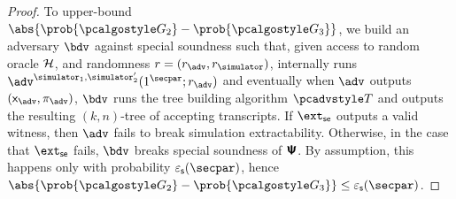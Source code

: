 \begin{proof}
	To upper-bound $\abs{\prob{\game{2}} - \prob{\game{3}}}$, we build an adversary $\bdv$ against special soundness such that,
	given access to random oracle $\mathcal{H}$, and randomness $r = (r_\adv, \rsim)$,
	internally runs $\advse^{\simulator_1, \simulator_2'} (1^\secpar; r_\adv)$ and eventually when $\advse$ outputs $(\inp_\advse, \zkproof_\advse)$, $\bdv$ runs the tree building algorithm $\tdv$ and outputs the resulting $(k,n)$-tree of accepting transcripts.
	If $\extse$ outputs a valid witness, then $\adv$ fails to break simulation extractability. Otherwise, in the case that $\extse$ fails, $\bdv$ breaks special soundness  of $\bm{\mathsf{\Psi}}$. By assumption, this happens only with probability $\epss(\secpar)$, hence $\abs{\prob{\game{2}} - \prob{\game{3}}} \leq \epss(\secpar)$.
	

\end{proof}
